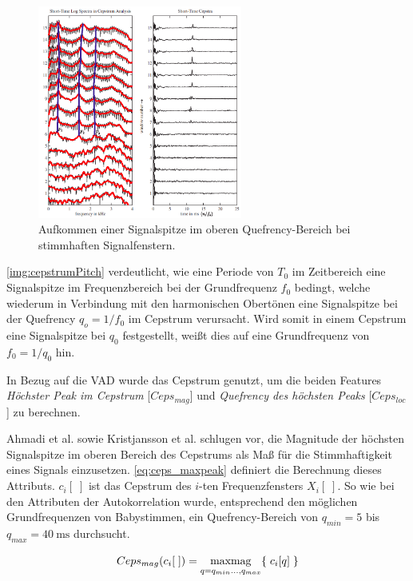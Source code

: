\begin{figure}[h]
	\centering
	\includegraphics[width=0.6\textwidth]{bilder/cepstrum05.png}
	\caption[Aufkommen einer Signalspitze im oberen Quefrency-Bereich]{Aufkommen einer Signalspitze im oberen Quefrency-Bereich bei stimmhaften Signalfenstern. \cite[\emph{Cepstral Analysis}, S. 17]{ricardo_ceps}}
	\label{img:cepstrumVoicedPeak}
\end{figure}

\autoref{img:cepstrumPitch} verdeutlicht, wie eine Periode von $T_0$ im Zeitbereich eine Signalspitze im Frequenzbereich bei der Grundfrequenz $f_0$ bedingt, welche wiederum in Verbindung mit den harmonischen Obertönen eine Signalspitze bei der Quefrency $q_o = 1 / f_0$ im Cepstrum verursacht. Wird somit in einem Cepstrum eine Signalspitze bei $q_0$ festgestellt, weißt dies auf eine Grundfrequenz von $f_0 = 1/q_0$ hin. \cite[S. 5]{cepstrumPitchTranslation}

In Bezug auf die VAD wurde das Cepstrum genutzt, um die beiden Features \emph{Höchster Peak im Cepstrum} [$Ceps_{mag}$] und \emph{Quefrency des höchsten Peaks} [$Ceps_{loc}$] zu berechnen.

Ahmadi et al. \cite{vad_ceps} sowie Kristjansson et al. \cite{vad_Lisboa} schlugen vor, die Magnitude der höchsten Signalspitze im oberen Bereich des Cepstrums als Maß für die Stimmhaftigkeit eines Signals einzusetzen. \autoref{eq:ceps_maxpeak} definiert die Berechnung dieses Attributs. $c_i[\;]$ ist das Cepstrum des $i$-ten Frequenzfensters $X_i[\;]$. So wie bei den Attributen der Autokorrelation wurde, entsprechend den möglichen Grundfrequenzen von Babystimmen, ein Quefrency-Bereich von $q_{min} = 5$ bis $q_{max} = \SI{40}{\milli\second}$ durchsucht.

\begin{equation}
Ceps_{mag}(c_i[\;]) = \operatorname*{max mag}_{q = q_{min} \ldots , q_{max}}\{ \; c_i[q] \; \}
\label{eq:ceps_maxpeak}
\end{equation}

